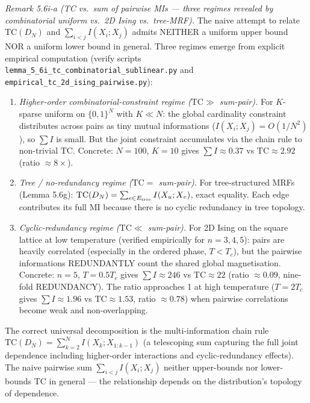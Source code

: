 \documentclass[
]{article}
\begin{document}
\emph{Remark 5.6i-a (TC vs.\ sum of pairwise MIs --- three regimes
revealed by combinatorial uniform vs.\ 2D Ising vs.\ tree-MRF).} The
naive attempt to relate $\mathrm{TC}(D_N)$ and $\sum_{i < j} I(X_i;
X_j)$ admits NEITHER a uniform upper bound NOR a uniform lower bound
in general. Three regimes emerge from explicit empirical computation
(verify scripts \texttt{lemma\_5\_6i\_tc\_combinatorial\_sublinear.py}
and \texttt{empirical\_tc\_2d\_ising\_pairwise.py}):
\begin{enumerate}
\item \emph{Higher-order combinatorial-constraint regime
($\mathrm{TC} \gg$ sum-pair).} For $K$-sparse uniform on
$\{0,1\}^N$ with $K \ll N$: the global cardinality constraint
distributes across pairs as tiny mutual informations
($I(X_i; X_j) = O(1/N^2)$), so $\sum I$ is small. But the joint
constraint accumulates via the chain rule to non-trivial
$\mathrm{TC}$. Concrete: $N = 100$, $K = 10$ gives $\sum I \approx
0.37$ vs $\mathrm{TC} \approx 2.92$ (ratio $\approx 8\times$).
\item \emph{Tree / no-redundancy regime ($\mathrm{TC} = $ sum-pair).}
For tree-structured MRFs (Lemma 5.6g):
$\mathrm{TC}(D_N) = \sum_{e \in E_{\rm tree}} I(X_u; X_v)$, exact
equality. Each edge contributes its full MI because there is no
cyclic redundancy in tree topology.
\item \emph{Cyclic-redundancy regime ($\mathrm{TC} \ll$ sum-pair).}
For 2D Ising on the square lattice at low temperature (verified
empirically for $n = 3, 4, 5$): pairs are heavily correlated
(especially in the ordered phase, $T < T_c$), but the pairwise
informations REDUNDANTLY count the shared global magnetisation.
Concrete: $n = 5$, $T = 0.5 T_c$ gives $\sum I \approx 246$ vs
$\mathrm{TC} \approx 22$ (ratio $\approx 0.09$, nine-fold
REDUNDANCY). The ratio approaches 1 at high temperature ($T = 2
T_c$ gives $\sum I \approx 1.96$ vs $\mathrm{TC} \approx 1.53$,
ratio $\approx 0.78$) when pairwise correlations become weak and
non-overlapping.
\end{enumerate}

The correct universal decomposition is the multi-information chain
rule $\mathrm{TC}(D_N) = \sum_{k=2}^{N} I(X_k; X_{1:k-1})$ (a
telescoping sum capturing the full joint dependence including
higher-order interactions and cyclic-redundancy effects). The naive
pairwise sum $\sum_{i<j} I(X_i; X_j)$ neither upper-bounds nor
lower-bounds $\mathrm{TC}$ in general --- the relationship depends
on the distribution's topology of dependence.
\end{document}
